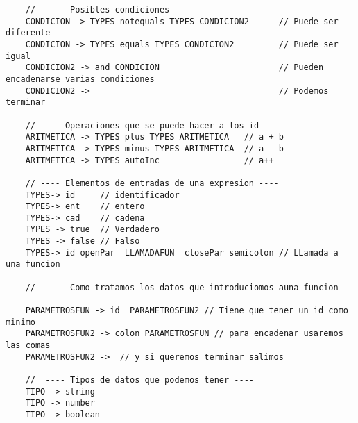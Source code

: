 \documentclass{article}
\begin{document}
\begin{verbatim}
    //  ---- Posibles condiciones ----
    CONDICION -> TYPES notequals TYPES CONDICION2      // Puede ser diferente
    CONDICION -> TYPES equals TYPES CONDICION2         // Puede ser igual 
    CONDICION2 -> and CONDICION                        // Pueden encadenarse varias condiciones
    CONDICION2 ->                                      // Podemos terminar
     
    // ---- Operaciones que se puede hacer a los id ----
    ARITMETICA -> TYPES plus TYPES ARITMETICA   // a + b      
    ARITMETICA -> TYPES minus TYPES ARITMETICA  // a - b
    ARITMETICA -> TYPES autoInc                 // a++

    // ---- Elementos de entradas de una expresion ---- 
    TYPES-> id     // identificador
    TYPES-> ent    // entero
    TYPES-> cad    // cadena 
    TYPES -> true  // Verdadero
    TYPES -> false // Falso
    TYPES-> id openPar  LLAMADAFUN  closePar semicolon // LLamada a una funcion

    //  ---- Como tratamos los datos que introduciomos auna funcion ----
    PARAMETROSFUN -> id  PARAMETROSFUN2 // Tiene que tener un id como minimo
    PARAMETROSFUN2 -> colon PARAMETROSFUN // para encadenar usaremos las comas
    PARAMETROSFUN2 ->  // y si queremos terminar salimos

    //  ---- Tipos de datos que podemos tener ----
    TIPO -> string 
    TIPO -> number
    TIPO -> boolean

\end{verbatim}
\end{document}
